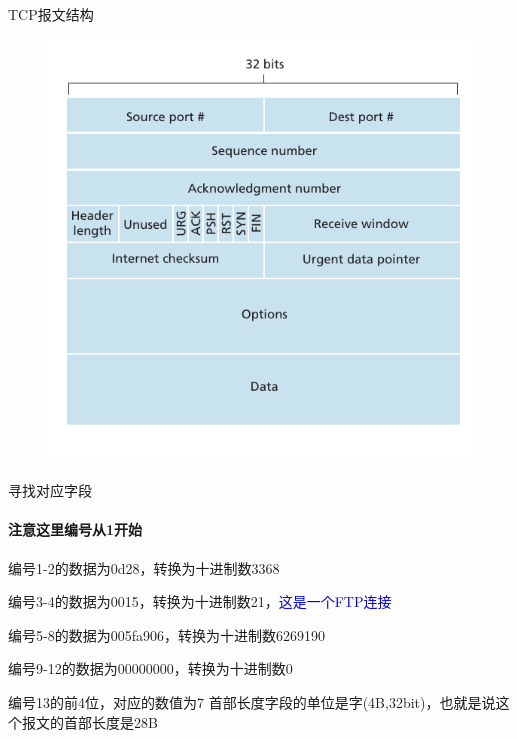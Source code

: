 \documentclass[presentation]{beamer}
\begin{document}
\begin{frame}{TCP报文结构}
	\begin{figure}
			\includegraphics[scale=.8]{seg.pdf}
	\end{figure}
	
\end{frame}

\begin{frame}{寻找对应字段}
	\framesubtitle{注意这里编号从1开始}
	\begin{description}
		\item<2->[源端口号] 编号1-2的数据为0d28，转换为十进制数3368
		\item<3->[目的端口号] 编号3-4的数据为0015，转换为十进制数21，\textcolor{blue}{这是一个FTP连接}
		\item<4->[序列号] 编号5-8的数据为005fa906，转换为十进制数6269190
		\item<5->[确认号] 编号9-12的数据为00000000，转换为十进制数0
		\item<6->[首部长度] 编号13的前4位，对应的数值为7
		首部长度字段的单位是字(4B,32bit)，也就是说这个报文的首部长度是28B
		\end{description}
\end{frame}
\end{document}
